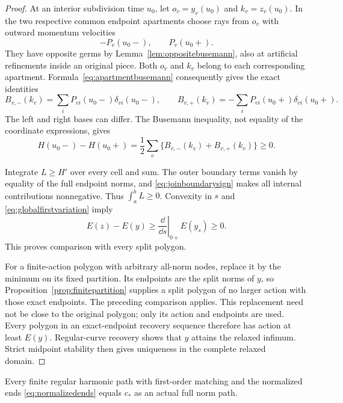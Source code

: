 \begin{proof}
At an interior subdivision time $u_0$, let
$o_v=y_v(u_0)$ and $k_v=z_v(u_0)$. In the two respective
common endpoint apartments choose rays from $o_v$ with outward
momentum velocities
\[
 -P_v(u_0-),\qquad P_v(u_0+).
\]
They have opposite germs by Lemma~\ref{lem:oppositebusemann},
also at artificial refinements inside an original piece.
Both $o_v$ and $k_v$ belong to each corresponding apartment.
Formula~\eqref{eq:apartmentbusemann} consequently gives the exact
identities
\[
 B_{v,-}(k_v)=\sum_iP_{vi}(u_0-)\delta_{vi}(u_0-),\qquad
 B_{v,+}(k_v)=-\sum_iP_{vi}(u_0+)\delta_{vi}(u_0+).
\]
The left and right bases can differ. The Busemann inequality,
not equality of the coordinate expressions, gives
\begin{equation}\label{eq:joinboundarysign}
 H(u_0-)-H(u_0+)
   =\frac12\sum_v\{B_{v,-}(k_v)+B_{v,+}(k_v)\}\ge0.
\end{equation}

Integrate $L\ge H'$ over every cell and sum. The outer boundary
terms vanish by equality of the full endpoint norms, and
\eqref{eq:joinboundarysign} makes all internal contributions
nonnegative. Thus $\int_a^bL\ge0$. Convexity in $s$ and
\eqref{eq:globalfirstvariation} imply
\[
 E(z)-E(y)\ge
 \left.\frac{\dd}{\dd s}\right|_{0+}E(y_s)\ge0.
\]
This proves comparison with every split polygon.

For a finite-action polygon with arbitrary all-norm nodes,
replace it by the minimum on its fixed partition. Its endpoints
are the split norms of $y$, so
Proposition~\ref{prop:finitepartition} supplies a split polygon
of no larger action with those exact endpoints. The preceding
comparison applies. This replacement need not be close to the
original polygon; only its action and endpoints are used.
Every polygon in an exact-endpoint recovery sequence therefore
has action at least $E(y)$. Regular-curve recovery shows that
$y$ attains the relaxed infimum. Strict midpoint stability
then gives uniqueness in the complete relaxed domain.
\end{proof}

\begin{theorem}\label{thm:wholelineconverse}
Every finite regular harmonic path with first-order matching and
the normalized ends \eqref{eq:normalizedends} equals $c_*$ as
an actual full norm path.
\end{theorem}

